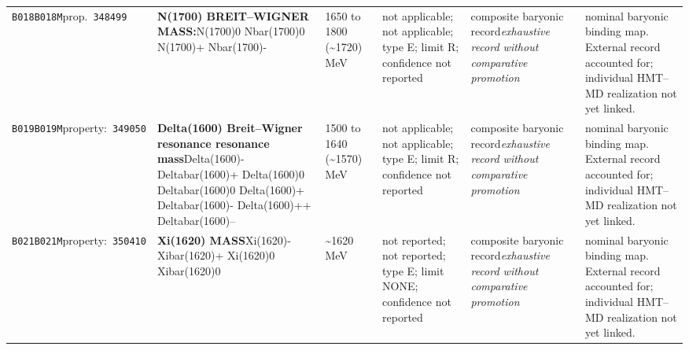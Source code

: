 \begin{landscape}
\begin{longtable}{L{1.85cm}L{4.45cm}L{2.35cm}L{4.05cm}L{3.35cm}L{7.15cm}}
\texttt{B018}\newline \texttt{B018M}\newline prop.\ \texttt{348499} & \textbf{N(1700) BREIT--WIGNER MASS:}\newline N(1700)0 \textbar{}\allowbreak{} Nbar(1700)0 \textbar{}\allowbreak{} N(1700)+ \textbar{}\allowbreak{} Nbar(1700)- & 1650 to 1800 (\textasciitilde{}1720)\,MeV & not applicable; not applicable; type E; limit R; confidence not reported & composite baryonic record\newline \emph{exhaustive record without comparative promotion} & nominal baryonic binding map. External record accounted for; individual HMT--MD realization not yet linked. \\
\texttt{B019}\newline \texttt{B019M}\newline property:\ \texttt{349050} & \textbf{Delta(1600) Breit--Wigner resonance resonance mass}\newline Delta(1600)- \textbar{}\allowbreak{} Deltabar(1600)+ \textbar{}\allowbreak{} Delta(1600)0 \textbar{}\allowbreak{} Deltabar(1600)0 \textbar{}\allowbreak{} Delta(1600)+ \textbar{}\allowbreak{} Deltabar(1600)- \textbar{}\allowbreak{} Delta(1600)++ \textbar{}\allowbreak{} Deltabar(1600)-- & 1500 to 1640 (\textasciitilde{}1570)\,MeV & not applicable; not applicable; type E; limit R; confidence not reported & composite baryonic record\newline \emph{exhaustive record without comparative promotion} & nominal baryonic binding map. External record accounted for; individual HMT--MD realization not yet linked. \\
\texttt{B021}\newline \texttt{B021M}\newline property:\ \texttt{350410} & \textbf{Xi(1620) MASS}\newline Xi(1620)- \textbar{}\allowbreak{} Xibar(1620)+ \textbar{}\allowbreak{} Xi(1620)0 \textbar{}\allowbreak{} Xibar(1620)0 & \textasciitilde{}1620\,MeV & not reported; not reported; type E; limit NONE; confidence not reported & composite baryonic record\newline \emph{exhaustive record without comparative promotion} & nominal baryonic binding map. External record accounted for; individual HMT--MD realization not yet linked. \\

\end{longtable}
\end{landscape}
